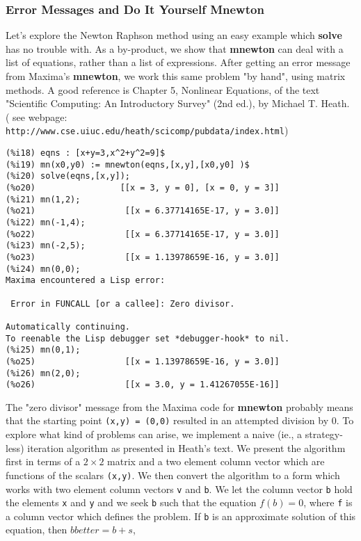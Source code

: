 \documentclass[12pt]{article}
\begin{document}
\subsubsection{Error Messages and Do It Yourself Mnewton}
Let's explore the Newton Raphson method using an easy example which
   \textbf{solve} has no trouble with.
As a by-product, we show that \textbf{mnewton} can deal with a list of equations, rather
than a list of expressions. 
After getting an error message from Maxima's \textbf{mnewton}, we work this same
  problem "by hand", using matrix methods.
A good reference is Chapter 5, Nonlinear Equations, of the text
  "Scientific Computing: An Introductory Survey" (2nd ed.), by Michael T. Heath.
( see webpage:\\
 \verb|http://www.cse.uiuc.edu/heath/scicomp/pubdata/index.html|)
\small
\begin{verbatim}
(%i18) eqns : [x+y=3,x^2+y^2=9]$
(%i19) mn(x0,y0) := mnewton(eqns,[x,y],[x0,y0] )$
(%i20) solve(eqns,[x,y]);
(%o20)                 [[x = 3, y = 0], [x = 0, y = 3]]
(%i21) mn(1,2);
(%o21)                  [[x = 6.37714165E-17, y = 3.0]]
(%i22) mn(-1,4);
(%o22)                  [[x = 6.37714165E-17, y = 3.0]]
(%i23) mn(-2,5);
(%o23)                  [[x = 1.13978659E-16, y = 3.0]]
(%i24) mn(0,0);
Maxima encountered a Lisp error:

 Error in FUNCALL [or a callee]: Zero divisor.

Automatically continuing.
To reenable the Lisp debugger set *debugger-hook* to nil.
(%i25) mn(0,1);
(%o25)                  [[x = 1.13978659E-16, y = 3.0]]
(%i26) mn(2,0);
(%o26)                  [[x = 3.0, y = 1.41267055E-16]]
\end{verbatim}
\normalsize
The "zero divisor" message from the Maxima code for \textbf{mnewton} probably 
  means that the starting point \verb|(x,y) = (0,0)| resulted in an attempted
  division by $0$.
To explore what kind of problems can arise, we implement a naive (ie., a 
  strategy-less) iteration algorithm as presented in Heath's text.
We present the algorithm first in terms of a $2 \times 2$ matrix and
  a two element column vector which are functions of the scalars \verb|(x,y)|.
We then convert the algorithm to a form which works with two element
  column vectors \verb|v| and \verb|b|.
We let the column vector \verb|b| hold the elements \verb|x| and \verb|y| and we 
  seek \verb|b| such that the equation $ f(b) = 0$, where \verb|f| is a column
  vector which defines the problem.
If \verb|b| is an approximate solution of this equation, then $bbetter = b + s$,
\end{document}
